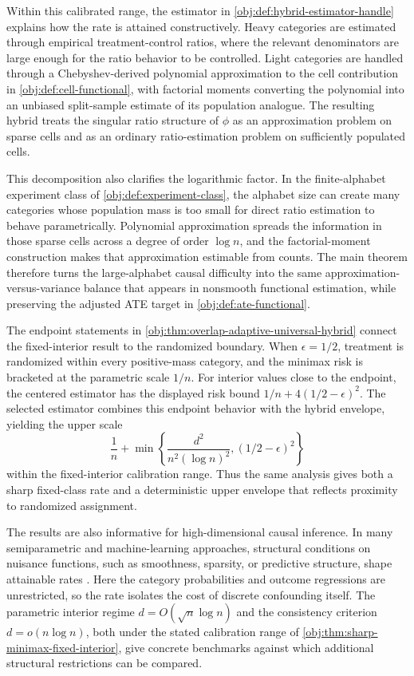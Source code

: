 \documentclass[11pt]{article}
\begin{document}
Within this calibrated range, the estimator in \cref{obj:def:hybrid-estimator-handle} explains how the rate is attained constructively. Heavy categories are estimated through empirical treatment-control ratios, where the relevant denominators are large enough for the ratio behavior to be controlled. Light categories are handled through a Chebyshev-derived polynomial approximation to the cell contribution in \cref{obj:def:cell-functional}, with factorial moments converting the polynomial into an unbiased split-sample estimate of its population analogue. The resulting hybrid treats the singular ratio structure of \(\phi\) as an approximation problem on sparse cells and as an ordinary ratio-estimation problem on sufficiently populated cells.

This decomposition also clarifies the logarithmic factor. In the finite-alphabet experiment class of \cref{obj:def:experiment-class}, the alphabet size can create many categories whose population mass is too small for direct ratio estimation to behave parametrically. Polynomial approximation spreads the information in those sparse cells across a degree of order \(\log n\), and the factorial-moment construction makes that approximation estimable from counts. The main theorem therefore turns the large-alphabet causal difficulty into the same approximation-versus-variance balance that appears in nonsmooth functional estimation, while preserving the adjusted ATE target in \cref{obj:def:ate-functional}.

The endpoint statements in \cref{obj:thm:overlap-adaptive-universal-hybrid} connect the fixed-interior result to the randomized boundary. When \(\epsilon=1/2\), treatment is randomized within every positive-mass category, and the minimax risk is bracketed at the parametric scale \(1/n\). For interior values close to the endpoint, the centered estimator has the displayed risk bound \(1/n+4(1/2-\epsilon)^2\). The selected estimator combines this endpoint behavior with the hybrid envelope, yielding the upper scale
\[
\frac1n+
\min\left\{
\frac{d^2}{n^2(\log n)^2},
(1/2-\epsilon)^2
\right\}
\]
within the fixed-interior calibration range. Thus the same analysis gives both a sharp fixed-class rate and a deterministic upper envelope that reflects proximity to randomized assignment.

The results are also informative for high-dimensional causal inference. In many semiparametric and machine-learning approaches, structural conditions on nuisance functions, such as smoothness, sparsity, or predictive structure, shape attainable rates \citep{Balakrishnan2023,JinSyrgkanis2025}. Here the category probabilities and outcome regressions are unrestricted, so the rate isolates the cost of discrete confounding itself. The parametric interior regime \(d=O(\sqrt n\log n)\) and the consistency criterion \(d=o(n\log n)\), both under the stated calibration range of \cref{obj:thm:sharp-minimax-fixed-interior}, give concrete benchmarks against which additional structural restrictions can be compared.
\end{document}
